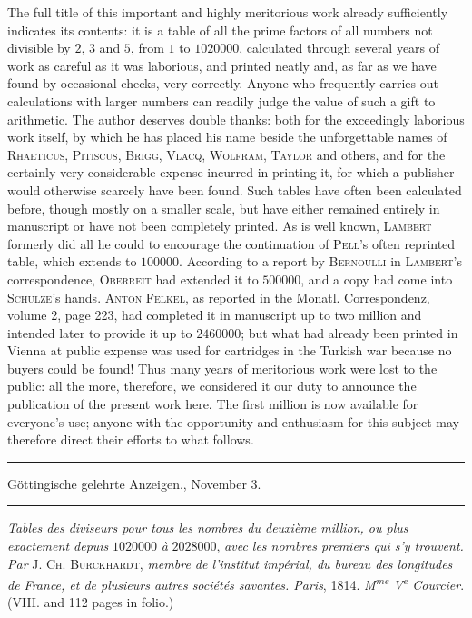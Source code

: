 The full title of this important and highly meritorious work already sufficiently indicates its contents: it is a table of all the prime factors of all numbers not divisible by $2$, $3$ and $5$, from $1$ to $1020000$, calculated through several years of work as careful as it was laborious, and printed neatly and, as far as we have found by occasional checks, very correctly. Anyone who frequently carries out calculations with larger numbers can readily judge the value of such a gift to arithmetic. The author deserves double thanks: both for the exceedingly laborious work itself, by which he has placed his name beside the unforgettable names of \textsc{Rhaeticus}, \textsc{Pitiscus}, \textsc{Brigg}, \textsc{Vlacq}, \textsc{Wolfram}, \textsc{Taylor} and others, and for the certainly very considerable expense incurred in printing it, for which a publisher would otherwise scarcely have been found. Such tables have often been calculated before, though mostly on a smaller scale, but have either remained entirely in manuscript or have not been completely printed. As is well known, \textsc{Lambert} formerly did all he could to encourage the continuation of \textsc{Pell}'s often reprinted table, which extends to $100000$. According to a report by \textsc{Bernoulli} in \textsc{Lambert}'s correspondence, \textsc{Oberreit} had extended it to $500000$, and a copy had come into \textsc{Schulze}'s hands. \textsc{Anton Felkel}, as reported in the Monatl. Correspondenz, volume 2, page 223, had completed it in manuscript up to two million and intended later to provide it up to $2460000$; but what had already been printed in Vienna at public expense was used for cartridges in the Turkish war because no buyers could be found! Thus many years of meritorious work were lost to the public: all the more, therefore, we considered it our duty to announce the publication of the present work here. The first million is now available for everyone's use; anyone with the opportunity and enthusiasm for this subject may therefore direct their efforts to what follows.

\begin{center}
\rule{.86\linewidth}{.3pt}\par
Göttingische gelehrte Anzeigen., November 3.\par
\rule{.86\linewidth}{.3pt}
\end{center}
\emph{Tables des diviseurs pour tous les nombres du deuxième million, ou plus exactement depuis} $1020000$ \emph{à} $2028000$, \emph{avec les nombres premiers qui s'y trouvent. Par} \textsc{J. Ch. Burckhardt}, \emph{membre de l'institut impérial, du bureau des longitudes de France, et de plusieurs autres sociétés savantes. Paris}, 1814. \emph{M\textsuperscript{me} V\textsuperscript{e} Courcier}. (VIII. and 112 pages in folio.)

